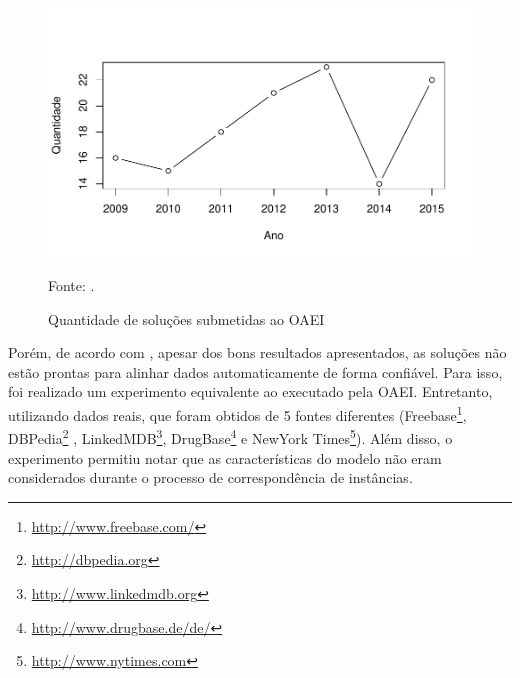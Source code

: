 \begin{figure}[!ht]
        \centering
        \includegraphics[width=1\textwidth]{./imagens/im_tools.pdf}
    \caption{Quantidade de soluções submetidas ao OAEI}
        \footnotesize{Fonte: \cite{cheatham2015results}.}
        \label{fig:oaei_imtools}
\end{figure}

Porém, de acordo com , apesar dos bons resultados apresentados, as soluções não estão prontas para alinhar dados automaticamente de forma confiável. Para isso, foi realizado um experimento equivalente ao executado pela OAEI. Entretanto, utilizando dados reais, que foram obtidos de 5 fontes diferentes (Freebase\footnote{\url{http://www.freebase.com/}}, DBPedia\footnote{\url{http://dbpedia.org}} , LinkedMDB\footnote{\url{http://www.linkedmdb.org}}, DrugBase\footnote{\url{http://www.drugbase.de/de/}} e NewYork Times\footnote{\url{http://www.nytimes.com}}). Além disso, o experimento permitiu notar que as características do modelo não eram considerados durante o processo de correspondência de instâncias.
        

